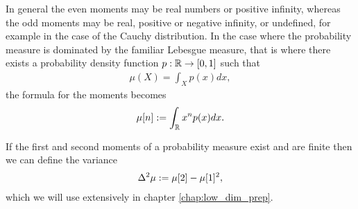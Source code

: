 In general the even moments may be real numbers or positive infinity, whereas the odd moments may be real, positive or negative infinity, or undefined, for example in the case of the Cauchy distribution. In the case where the probability measure is dominated by the familiar Lebesgue measure, that is where there exists a probability density function $p:\mathbb{R}\to[0,1]$ such that
\begin{align}
  \mu(X) = \int_X p(x) dx,
\end{align}
the formula for the moments becomes
\begin{align}
  \mu[n] := \int_{\mathbb{R}} x^n p(x) dx.
\end{align}


If the first and second moments of a probability measure exist and are finite then we can define the variance
\begin{align}
  \var{\mu} \defeq \mu[2] - \mu[1]^2, \label{eqn:prelim-def-variance}
\end{align}
which we will use extensively in chapter \ref{chap:low_dim_prep}.

